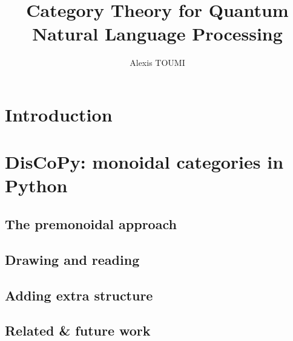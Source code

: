 

\title{Category Theory for Quantum\\
Natural Language Processing}
\author{Alexis TOUMI}

\degreedate{\today}




\begin{romanpages}
\maketitle

% 

\tableofcontents

\end{romanpages}

\chapter*{Introduction}






\chapter{DisCoPy: monoidal categories in Python}





\section{The premonoidal approach}

\section{Drawing and reading}

\section{Adding extra structure}

\section{Related \& future work}

